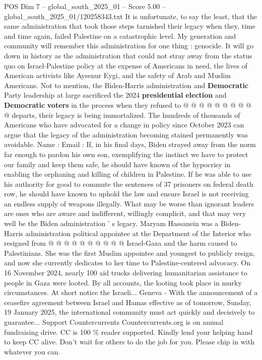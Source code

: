 \begin{textsample}{POS Dim 7 – global\_south\_2025\_01 – Score 5.00 – global\_south\_2025\_01/120258343.txt}
It is unfortunate, to say the least, that the same administration that took those steps tarnished their legacy when they, time and time again, failed Palestine on a catastrophic level.
My generation and community will remember this administration for one thing : genocide.
It will go down in history as the administration that could not stray away from the status quo on Israel-Palestine policy at the expense of Americans in need, the lives of American activists like Aysenur Eygi, and the safety of Arab and Muslim Americans.
Not to mention, the Biden-Harris administration and \textbf{Democratic} Party leadership at large sacrificed the 2024 \textbf{presidential} \textbf{election} and \textbf{Democratic} \textbf{voters} in the process when they refused to @ @ @ @ @ @ @ @ @ @ departs, their legacy is being immortalized.
The hundreds of thousands of Americans who have advocated for a change in policy since October 2023 can argue that the legacy of the administration becoming stained permanently was avoidable.
Name : Email : If, in his final days, Biden strayed away from the norm far enough to pardon his own son, exemplifying the instinct we have to protect our family and keep them safe, he should have known of the hypocrisy in enabling the orphaning and killing of children in Palestine.
If he was able to use his authority for good to commute the sentences of 37 prisoners on federal death row, he should have known to uphold the law and ensure Israel is not receiving an endless supply of weapons illegally.
What may be worse than ignorant leaders are ones who are aware and indifferent, willingly complicit, and that may very well be the Biden administration ' s legacy.
Maryam Hassanein was a Biden-Harris administration political appointee at the Department of the Interior who resigned from @ @ @ @ @ @ @ @ @ @ Israel-Gaza and the harm caused to Palestinians.
She was the first Muslim appointee and youngest to publicly resign, and now she currently dedicates to her time to Palestine-centered advocacy.
On 16 November 2024, nearly 100 aid trucks delivering humanitarian assistance to people in Gaza were looted.
By all accounts, the looting took place in murky circumstances.
At short notice the Israeli...
Geneva - With the announcement of a ceasefire agreement between Israel and Hamas effective as of tomorrow, Sunday, 19 January 2025, the international community must act quickly and decisively to guarantee...
Support Countercurrents Countercurrents.org is on annual fundraising drive.
CC is 100 \% reader supported.
Kindly lend your helping hand to keep CC alive.
Don't wait for others to do the job for you.
Please chip in with whatever you can.

\end{textsample}
